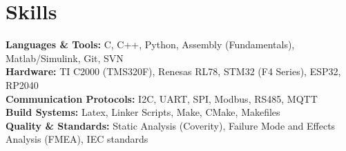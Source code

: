 \documentclass[letterpaper,11pt]{article}
\begin{document}
\vspace{-3pt}
\section{Skills}
\vspace{2pt}

  \textbf{Languages \& Tools:} {C, C++, Python, Assembly (Fundamentals), Matlab/Simulink, Git, SVN} \\ \vspace{2pt}
  \textbf{Hardware:} {TI C2000 (TMS320F), Renesas RL78, STM32 (F4 Series), ESP32, RP2040} \\ \vspace{2pt}
  \textbf{Communication Protocols:} {I2C, UART, SPI, Modbus, RS485, MQTT} \\ \vspace{2pt}
  \textbf{Build Systems:} {Latex, Linker Scripts, Make, CMake, Makefiles} \\ \vspace{2pt}
  \textbf{Quality \& Standards:} {Static Analysis (Coverity), Failure Mode and Effects Analysis (FMEA), IEC standards} \\ \vspace{2pt}

\vspace{-8pt}
\end{document}
